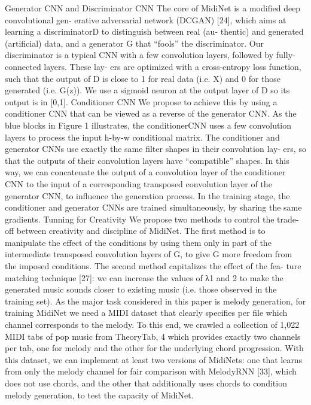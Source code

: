 Generator CNN and Discriminator CNN
The core of MidiNet is a modified deep convolutional gen- erative adversarial network (DCGAN) [24], which aims at learning a discriminatorD to distinguish between real (au- thentic) and generated (artificial) data, and a generator G that “fools” the discriminator. Our discriminator is a typical CNN with a few convolution layers, followed by fully-connected layers. These lay- ers are optimized with a cross-entropy loss function, such that the output of D is close to 1 for real data (i.e. X) and 0 for those generated (i.e. G(z)). We use a sigmoid neuron at the output layer of D so its output is in [0,1].
Conditioner CNN
We propose to achieve this by using a conditioner CNN
that can be viewed as a reverse of the generator CNN. As the blue blocks in Figure 1 illustrates, the conditionerCNN uses a few convolution layers to process the input h-by-w conditional matrix. The conditioner and generator CNNs use exactly the same filter shapes in their convolution lay- ers, so that the outputs of their convolution layers have “compatible” shapes. In this way, we can concatenate the output of a convolution layer of the conditioner CNN to the input of a corresponding transposed convolution layer of the generator CNN, to influence the generation process. In the training stage, the conditioner and generator CNNs are trained simultaneously, by sharing the same gradients.
Tunning for Creativity
We propose two methods to control the trade-off between creativity and discipline of MidiNet. The first method is to manipulate the effect of the conditions by using them only in part of the intermediate transposed convolution layers of G, to give G more freedom from the imposed conditions. The second method capitalizes the effect of the fea- ture matching technique [27]: we can increase the values of λ1 and 2 to make the generated music sounds closer to existing music (i.e. those observed in the training set).
As the major task considered in this paper is melody generation, for training MidiNet we need a MIDI dataset that clearly specifies per file which channel corresponds to the melody. To this end, we crawled a collection of 1,022 MIDI tabs of pop music from TheoryTab, 4 which provides exactly two channels per tab, one for melody and the other for the underlying chord progression. With this dataset, we can implement at least two versions of MidiNets: one that learns from only the melody channel for fair comparison with MelodyRNN [33], which does not use chords, and the other that additionally uses chords to condition melody generation, to test the capacity of MidiNet.
